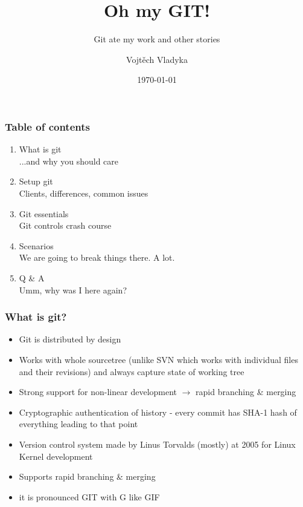 \documentclass[aspectratio=169]{beamer}
\title{Oh my GIT!}
\subtitle{Git ate my work and other stories}
\author{Vojtěch Vladyka}
\date{\today}
\begin{document}
    \frame{\titlepage}
    \begin{frame}
       \frametitle{Table of contents}
       \begin{enumerate}
           \item What is git
           \\   \textcolor{solarizedRebase01}{\footnotesize\hspace{1em} ...and why you should care}	
           \item Setup git
           \\   \textcolor{solarizedRebase01}{\footnotesize\hspace{1em} Clients, differences, common issues}	
           \item Git essentials
           \\   \textcolor{solarizedRebase01}{\footnotesize\hspace{1em} Git controls crash course}	
           \item Scenarios
           \\   \textcolor{solarizedRebase01}{\footnotesize\hspace{1em} We are going to break things there. A lot.}	
           \item Q \& A
           \\   \textcolor{solarizedRebase01}{\footnotesize\hspace{1em} Umm, why was I here again?}
       \end{enumerate}
    \end{frame}

    \begin{frame}
        \frametitle{What is git?}
        \begin{itemize}
            \item Git is distributed by design
            \item Works with whole sourcetree (unlike SVN which works with individual files and their revisions) and always capture state of working tree
            \item Strong support for non-linear development $\rightarrow$ rapid branching \& merging
            \item Cryptographic authentication of history - every commit has SHA-1 hash of everything leading to that point
            \item Version control system made by Linus Torvalds (mostly) at 2005 for Linux Kernel development
            \item Supports rapid branching \& merging
            \item it is pronounced GIT with G like GIF ~
        \end{itemize}
    \end{frame}
    
\end{document}
